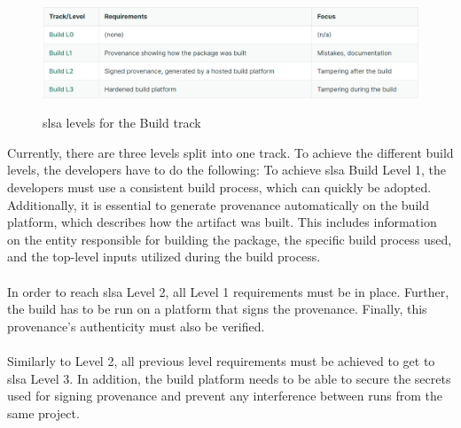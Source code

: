 \vspace{2mm}
\begin{figure}[H]
    \centering
    \includegraphics[width=0.8\columnwidth]{Images/slsalevels.png}
    \caption{\acrshort{slsa} levels for the Build track}\cite{SLSAlevels}
    \label{fig: SLSA levels for the Build track}
\end{figure}
Currently, there are three levels split into one track. To achieve the different build levels, the developers have to do the following:
\newpage
To achieve \acrshort{slsa} Build Level 1, the developers must use a consistent build process, which can quickly be adopted. Additionally, it is essential to generate \gls{provenance} automatically on the build platform, which describes how the artifact was built. This includes information on the entity responsible for building the package, the specific build process used, and the top-level inputs utilized during the build process.
\\~\\
In order to reach \acrshort{slsa} Level 2, all Level 1 requirements must be in place. Further, the build has to be run on a platform that signs the \gls{provenance}. Finally, this \gls{provenance}'s authenticity must also be verified.
\\~\\
Similarly to Level 2, all previous level requirements must be achieved to get to \acrshort{slsa} Level 3. In addition, the build platform needs to be able to secure the secrets used for signing \gls{provenance} and prevent any interference between runs from the same project.  


